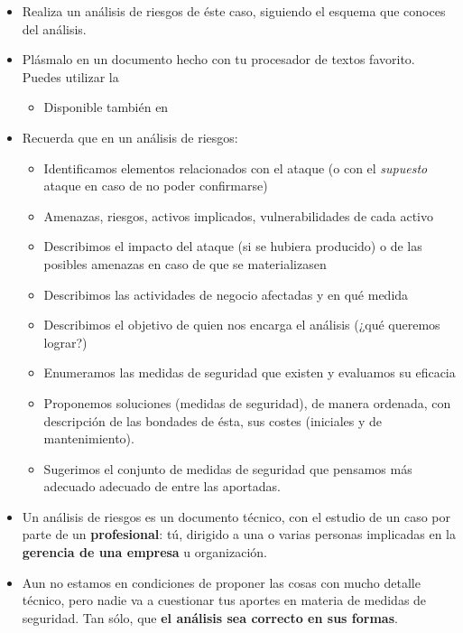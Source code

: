 \begin{itemize}
\item Realiza un análisis de riesgos de éste caso, siguiendo el esquema que conoces del análisis.
\item Plásmalo en un documento hecho con tu procesador de textos favorito. Puedes utilizar la 
  \begin{itemize}
  \item Disponible también en
\end{itemize}

\item Recuerda que en un análisis de riesgos:
  \begin{itemize}
  \item Identificamos elementos relacionados con el ataque (o con el \textit{supuesto} ataque en caso de no poder confirmarse)
  \item Amenazas, riesgos, activos implicados, vulnerabilidades de cada activo
  \item Describimos el impacto del ataque (si se hubiera producido) o de las posibles amenazas en caso de que se materializasen
  \item Describimos las actividades de negocio afectadas y en qué medida
  \item Describimos el objetivo de quien nos encarga el análisis (¿qué queremos lograr?)
  \item Enumeramos las medidas de seguridad que existen y evaluamos su eficacia
  \item Proponemos soluciones (medidas de seguridad), de manera ordenada, con descripción de las bondades de ésta, sus costes (iniciales y de mantenimiento).
  \item Sugerimos el conjunto de medidas de seguridad que pensamos más adecuado adecuado de entre las aportadas.
  \end{itemize}
\item Un análisis de riesgos es un documento técnico, con el estudio de un caso por parte de un \textbf{profesional}: tú, dirigido a una o varias personas implicadas en la \textbf{gerencia de una empresa} u organización.
\item Aun no estamos en condiciones de proponer las cosas con mucho detalle técnico, pero nadie va a cuestionar tus aportes en materia de medidas de seguridad. Tan sólo, que \textbf{el análisis sea correcto en sus formas}.
\end{itemize}

